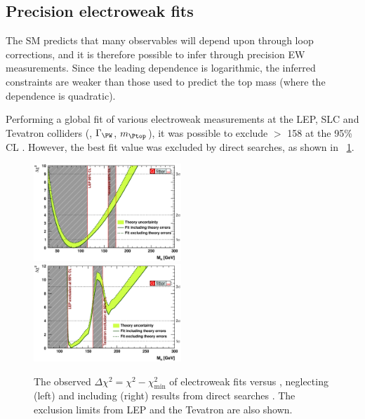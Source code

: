 \subsection{Precision electroweak fits}
\label{sec:prior_constraints:ew_fits}

The \ac{SM} predicts that many observables will depend upon \mH through loop corrections,
and it is therefore possible to infer \mH through precision \ac{EW} measurements. Since 
the leading \mH dependence is logarithmic, the inferred constraints are weaker than those
used to predict the top mass (where the dependence is quadratic).

Performing a global fit of various electroweak measurements at the \acs{LEP}, SLC and
Tevatron colliders (\eg \mW, $\Gamma_{\PW}$, $m_{\Ptop}$), it was possible to exclude 
\mH $>$ \unit{158}{\GeV} at the 95\% \ac{CL} \cite{Gfitter:2008}. However, the best fit 
value was excluded by direct searches, as shown in \Figure~\ref{fig:ewfit}.

\begin{figure}
	\includegraphics[width=0.495\textwidth]{tex/motivation/ewfit_nodirect}
	\hfill
	\includegraphics[width=0.495\textwidth]{tex/motivation/ewfit_withdirect}
	\caption{The observed $\Delta\chi^2 = \chi^2 - \chi^2_{\min}$ of electroweak fits 
	versus \mH, neglecting (left) and including (right) results from direct searches
	\cite{Gfitter:2008}. The exclusion limits from LEP and the Tevatron are also shown.}
	\label{fig:ewfit}
\end{figure}


